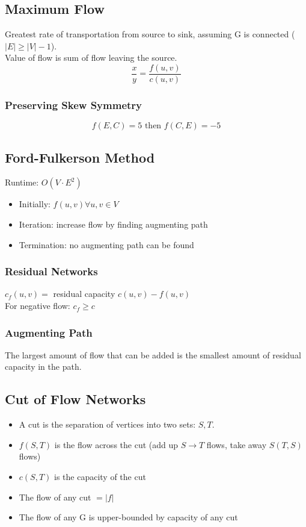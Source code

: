 \subsection{Maximum Flow}
Greatest rate of transportation from source to sink, assuming G is connected ($|E| \geq |V|-1$).\\
Value of flow is sum of flow leaving the source.
$$\frac{x}{y}=\frac{f(u,v)}{c(u,v)}$$

\subsubsection{Preserving Skew Symmetry}
$$f(E,C)=5 \text{ then } f(C,E)=-5$$

\subsection{Ford-Fulkerson Method}
Runtime: $O(V\cdot E^2)$
\begin{itemize}
    \item Initially: $f(u,v) \forall u,v \in V$
    \item Iteration: increase flow by finding augmenting path
    \item Termination: no augmenting path can be found
\end{itemize}

\subsubsection{Residual Networks}
$c_f(u,v)=$ residual capacity $c(u,v)-f(u,v)$\\
For negative flow: $c_f \geq c$

\subsubsection{Augmenting Path}
The largest amount of flow that can be added is the smallest amount of residual capacity in the path.

\subsection{Cut of Flow Networks}
\begin{itemize}
    \item A cut is the separation of vertices into two sets: $S,T$.
    \item $f(S,T)$ is the flow across the cut (add up $S\rightarrow T$ flows, take away $S(T,S)$ flows)
    \item $c(S,T)$ is the capacity of the cut
    \item The flow of any cut $ =|f|$
    \item The flow of any G is upper-bounded by capacity of any cut
\end{itemize}

